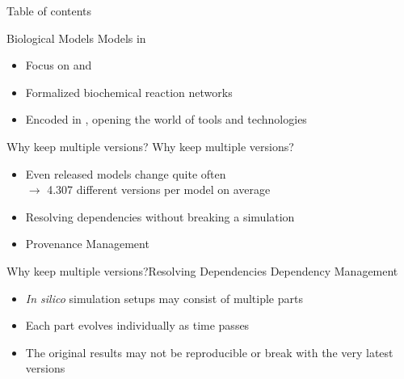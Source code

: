 


\begin{frame}{Table of contents}
	\tableofcontents
\end{frame}
 
\begin{frame}{Biological Models}{}
	{\Large Models in \sysbio}
	\\[2.5em]
	\begin{itemize}
		\item Focus on \sbml \citep{Hucka2003} and \cellml \citep{Cuellar2003}
		\item Formalized biochemical reaction networks
		\item Encoded in \xml, opening the world of \xml tools and technologies
		
	\end{itemize}
\end{frame}

\begin{frame}{Why keep multiple versions?}{}
	{\Large Why keep multiple versions?}
	\\[2.5em]
	\begin{itemize}
		\item Even released models change quite often \\
		$\rightarrow $ 4.307 different versions per model on average
		\item Resolving dependencies without breaking a simulation
		\item Provenance Management
	\end{itemize}
\end{frame}

\begin{frame}{Why keep multiple versions?}{Resolving Dependencies}
	{\Large Dependency Management}
	\\[2.5em]
	\begin{itemize}
		\item \emph{In silico} simulation setups may consist of multiple parts \citep{Waltemath2013}
		\item Each part evolves individually as time passes
		\item The original results may not be reproducible or break with the very latest versions
	\end{itemize}
\end{frame}


